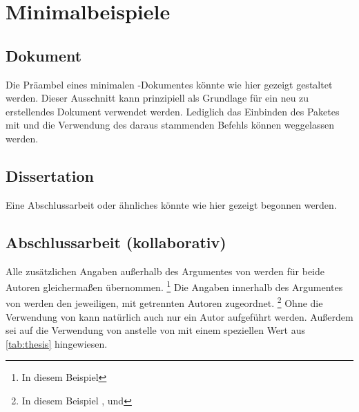 \chapter{%
  Minimalbeispiele%
  \label{sec:exmpl}%
}
\section{%
  Dokument%
}

Die Präambel eines minimalen -Dokumentes könnte wie hier 
gezeigt gestaltet werden. Dieser Ausschnitt kann prinzipiell als Grundlage für 
ein neu zu erstellendes Dokument verwendet werden. Lediglich das Einbinden des 
Paketes  mit  und 
die Verwendung des daraus stammenden Befehls  können 
weggelassen werden.



\section{%
  Dissertation%
  \label{sec:exmpl:dissertation}%
}

Eine Abschlussarbeit oder ähnliches könnte wie hier gezeigt begonnen werden.



\section{%
  Abschlussarbeit (kollaborativ)%
  \label{sec:exmpl:thesis}%
}

Alle zusätzlichen Angaben außerhalb des Argumentes von  werden 
für beide Autoren gleichermaßen übernommen.%
\footnote{In diesem Beispiel }
Die Angaben innerhalb des Argumentes von  werden den jeweiligen, 
mit  getrennten Autoren zugeordnet.%
\footnote{%
  In diesem Beispiel ,  und 
}
Ohne die Verwendung von  kann natürlich auch nur ein Autor 
aufgeführt werden. Außerdem sei auf die Verwendung von  anstelle 
von  mit einem speziellen Wert aus \autoref{tab:thesis} 
hingewiesen.



